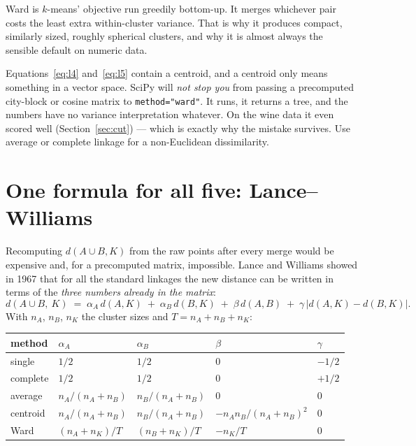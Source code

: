 \documentclass[11pt]{article}
\begin{document}
\begin{keyidea}
Ward is $k$-means' objective run greedily bottom-up. It merges whichever pair
costs the least extra within-cluster variance. That is why it produces
compact, similarly sized, roughly spherical clusters, and why it is almost
always the sensible default on numeric data.
\end{keyidea}

\begin{caution}
Equations~\eqref{eq:l4} and~\eqref{eq:l5} contain a centroid, and a centroid
only means something in a vector space. SciPy will \emph{not stop you} from
passing a precomputed city-block or cosine matrix to
\texttt{method="ward"}. It runs, it returns a tree, and the numbers have no
variance interpretation whatever. On the wine data it even scored well
(Section~\ref{sec:cut}) --- which is exactly why the mistake survives. Use
average or complete linkage for a non-Euclidean dissimilarity.
\end{caution}

\section{One formula for all five: Lance--Williams}
\label{sec:lw}

Recomputing $d(A \cup B, K)$ from the raw points after every merge would be
expensive and, for a precomputed matrix, impossible. Lance and Williams showed
in 1967 that for all the standard linkages the new distance can be written in
terms of the \emph{three numbers already in the matrix}:
\begin{equation}
  d(A \cup B,\ K) \;=\; \alpha_A\, d(A,K) \;+\; \alpha_B\, d(B,K)
  \;+\; \beta\, d(A,B) \;+\; \gamma\, \bigl| d(A,K) - d(B,K) \bigr| .
  \label{eq:lw}
\end{equation}
With $n_A$, $n_B$, $n_K$ the cluster sizes and $T = n_A + n_B + n_K$:

\begin{center}
\begin{tabular}{lllll}
  \toprule
  method & $\alpha_A$ & $\alpha_B$ & $\beta$ & $\gamma$ \\
  \midrule
  single   & $1/2$ & $1/2$ & $0$ & $-1/2$ \\
  complete & $1/2$ & $1/2$ & $0$ & $+1/2$ \\
  average  & $n_A/(n_A{+}n_B)$ & $n_B/(n_A{+}n_B)$ & $0$ & $0$ \\
  centroid & $n_A/(n_A{+}n_B)$ & $n_B/(n_A{+}n_B)$ &
             $-n_A n_B/(n_A{+}n_B)^2$ & $0$ \\
  Ward     & $(n_A{+}n_K)/T$ & $(n_B{+}n_K)/T$ & $-n_K/T$ & $0$ \\
  \bottomrule
\end{tabular}
\end{center}
\end{document}
